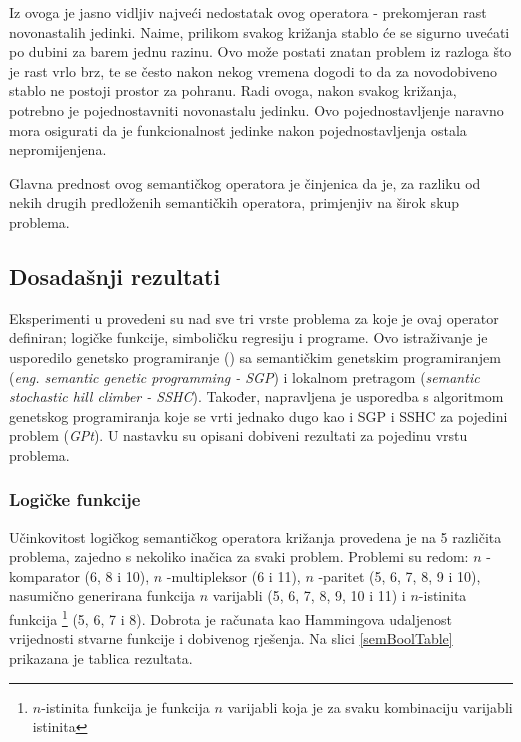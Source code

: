 Iz ovoga je jasno vidljiv najveći nedostatak ovog operatora - prekomjeran rast novonastalih jedinki. Naime, prilikom svakog križanja stablo će se sigurno uvećati po dubini za barem jednu razinu. Ovo može postati znatan problem iz razloga što je rast vrlo brz, te se često nakon nekog vremena dogodi to da za novodobiveno stablo ne postoji prostor za pohranu. Radi ovoga, nakon svakog križanja, potrebno je pojednostavniti novonastalu jedinku. Ovo pojednostavljenje naravno mora osigurati da je funkcionalnost jedinke nakon pojednostavljenja ostala nepromijenjena.

Glavna prednost ovog semantičkog operatora je činjenica da je, za razliku od nekih drugih predloženih semantičkih operatora, primjenjiv na širok skup problema.

\subsection{Dosadašnji rezultati}

Eksperimenti u \cite{crxSem} provedeni su nad sve tri vrste problema za koje je ovaj operator definiran; logičke funkcije, simboličku regresiju i programe. Ovo istraživanje je usporedilo genetsko programiranje () sa semantičkim genetskim programiranjem (\textit{eng. semantic genetic programming - SGP}) i lokalnom pretragom (\textit{semantic stochastic hill climber - SSHC}). Također, napravljena je usporedba s algoritmom genetskog programiranja koje se vrti jednako dugo kao i SGP i SSHC za pojedini problem (\textit{GPt}). U nastavku su opisani dobiveni rezultati za pojedinu vrstu problema.

\subsubsection{Logičke funkcije}

Učinkovitost logičkog semantičkog operatora križanja provedena je na 5 različita problema, zajedno s nekoliko inačica za svaki problem. Problemi su redom: $n$ -komparator (6, 8 i 10), $n$ -multipleksor (6 i 11), $n$ -paritet (5, 6, 7, 8, 9 i 10), nasumično generirana funkcija $n$ varijabli (5, 6, 7, 8, 9, 10 i 11) i $n$-istinita funkcija \footnote{$n$-istinita funkcija je funkcija $n$ varijabli koja je za svaku kombinaciju varijabli istinita} (5, 6, 7 i 8). Dobrota je računata kao Hammingova udaljenost vrijednosti stvarne funkcije i dobivenog rješenja. Na slici \ref{semBoolTable} prikazana je tablica rezultata. 

